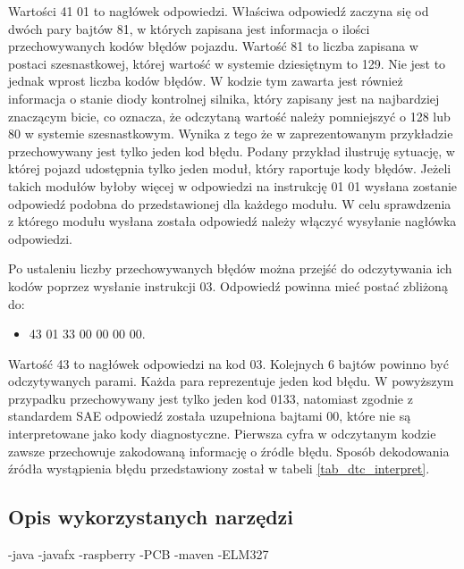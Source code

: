 \documentclass[12pt]{article} %
\numberwithin{equation}{subsection}
\numberwithin{figure}{section}
\numberwithin{table}{section}
\begin{document}
		Wartości 41 01 to nagłówek odpowiedzi. Właściwa odpowiedź zaczyna się od dwóch pary bajtów 81, w których zapisana jest informacja o ilości przechowywanych kodów błędów pojazdu. Wartość 81 to liczba zapisana w postaci szesnastkowej, której wartość w systemie dziesiętnym to 129. Nie jest to jednak wprost liczba kodów błędów. W kodzie tym zawarta jest również informacja o stanie diody kontrolnej silnika, który zapisany jest na najbardziej znaczącym bicie, co oznacza, że odczytaną wartość należy pomniejszyć o 128 lub 80 w systemie szesnastkowym. Wynika z tego że w zaprezentowanym przykładzie przechowywany jest tylko jeden kod błędu. Podany przykład ilustruję sytuację, w której pojazd udostępnia tylko jeden moduł, który raportuje kody błędów. Jeżeli takich modułów byłoby więcej w odpowiedzi na instrukcję 01 01 wysłana zostanie odpowiedź podobna do przedstawionej dla każdego modułu. W celu sprawdzenia z którego modułu wysłana została odpowiedź należy włączyć wysyłanie nagłówka odpowiedzi.
		
		Po ustaleniu liczby przechowywanych błędów można przejść do odczytywania ich kodów poprzez wysłanie instrukcji 03. Odpowiedź powinna mieć postać zbliżoną do:
		
		\begin{itemize}
			\item{43 01 33 00 00 00 00.}
		\end{itemize}
		
		Wartość 43 to nagłówek odpowiedzi na kod 03. Kolejnych 6 bajtów powinno być odczytywanych parami. Każda para reprezentuje jeden kod błędu. W powyższym przypadku przechowywany jest tylko jeden kod 0133, natomiast zgodnie z standardem SAE odpowiedź została uzupełniona bajtami 00, które nie są interpretowane jako kody diagnostyczne. Pierwsza cyfra w odczytanym kodzie zawsze przechowuje zakodowaną informację o źródle błędu. Sposób dekodowania źródła wystąpienia błędu przedstawiony został w tabeli \ref{tab_dtc_interpret}.
		
		\newpage
		
		
		
	
		\newpage	
	
	\subsection{Opis wykorzystanych narzędzi}
		\hspace{0.5cm}
		-java
		-javafx
		-raspberry
		-PCB
		-maven
		-ELM327
	
		\newpage
	
\end{document}
